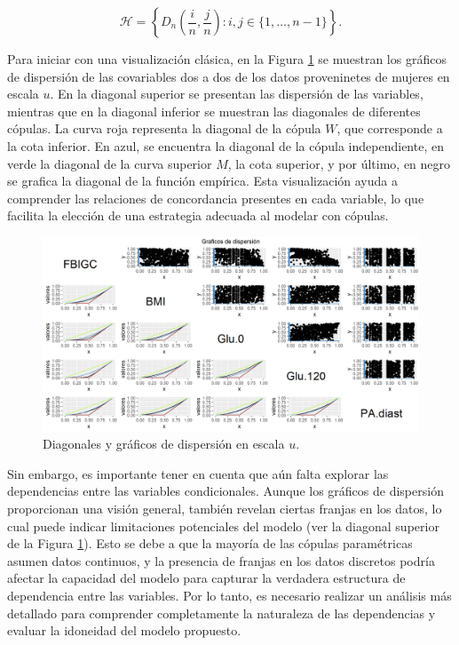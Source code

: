 \begin{equation}\label{H}
    \mathscr{H} =\left\{ D_n\left( \frac{i}{n}, \frac{j}{n}\right) : i, j \in\{1, \ldots, n-1\}\right\}.
\end{equation}


Para iniciar con una visualización clásica, en la Figura \ref{fig:diagE} se muestran los gráficos de dispersión de las covariables dos a dos de los datos proveninetes de mujeres en escala $u$. En la diagonal superior se presentan las dispersión de las variables, mientras que en la diagonal inferior se muestran las diagonales de diferentes cópulas. La curva roja representa la diagonal de la cópula $W$, que corresponde a la cota inferior. En azul, se encuentra la diagonal de la cópula independiente, en verde la diagonal de la curva superior $M$, la cota superior, y por último, en negro se grafica la diagonal de la función empírica. Esta visualización ayuda a comprender las relaciones de concordancia presentes en cada variable, lo que facilita la elección de una estrategia adecuada al modelar con cópulas.

\begin{figure}[H]
    \centering
    \includegraphics[width = 0.97 \textwidth]{4img/UdiagM.png}
    \caption{Diagonales y gráficos de dispersión en escala $u$.}
    \label{fig:diagE}
\end{figure}

Sin embargo, es importante tener en cuenta que aún falta explorar las dependencias entre las variables condicionales. Aunque los gráficos de dispersión proporcionan una visión general, también revelan ciertas franjas en los datos, lo cual puede indicar limitaciones potenciales del modelo (ver la diagonal superior de la Figura \ref{fig:diagE}). Esto se debe a que la mayoría de las cópulas paramétricas asumen datos continuos, y la presencia de franjas en los datos discretos podría afectar la capacidad del modelo para capturar la verdadera estructura de dependencia entre las variables. Por lo tanto, es necesario realizar un análisis más detallado para comprender completamente la naturaleza de las dependencias y evaluar la idoneidad del modelo propuesto.

